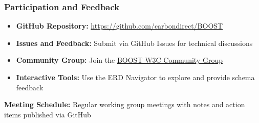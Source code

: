 \subsubsection{Participation and Feedback}
\label{sec:participation}

\begin{informative}[title=How to Contribute]
\begin{itemize}
    \item \textbf{GitHub Repository:} \url{https://github.com/carbondirect/BOOST}
    \item \textbf{Issues and Feedback:} Submit via GitHub Issues for technical discussions
    \item \textbf{Community Group:} Join the \href{https://www.w3.org/community/boost-01/}{BOOST W3C Community Group}
    \item \textbf{Interactive Tools:} Use the ERD Navigator to explore and provide schema feedback
\end{itemize}

\textbf{Meeting Schedule:} Regular working group meetings with notes and action items published via GitHub
\end{informative}